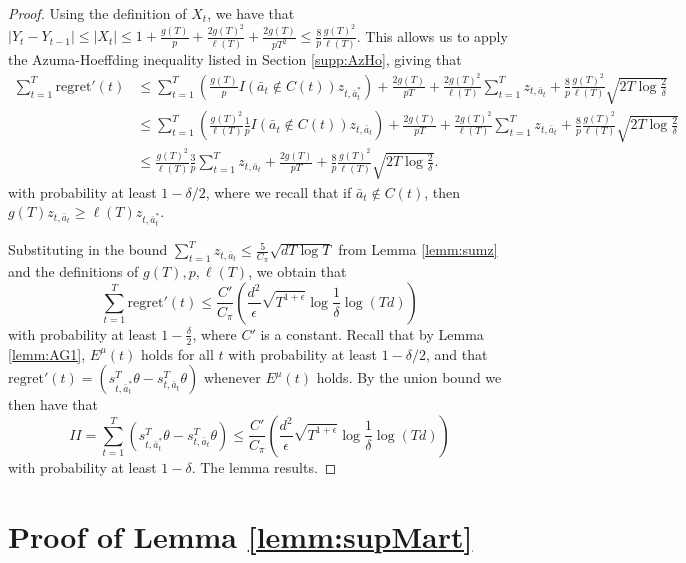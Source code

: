 \documentclass{article}
\begin{document}
\begin{appendices}
\begin{proof}
Using the definition of $X_t$, we have that $|Y_t - Y_{t-1}| \leq |X_t| \leq 1 + \frac{g(T)}{p} + \frac{2g(T)^2}{\ell(T)} + \frac{2 g(T)}{p T^2} \leq \frac{8}{p} \frac{g(T)^2}{\ell(T)}$. This allows us to apply the Azuma-Hoeffding inequality listed in Section \ref{supp:AzHo}, giving that
\begin{align*}
\sum_{t=1}^T \mathrm{regret}'(t) &\leq \sum_{t=1}^T \left(\frac{g(T)}{p} I(\bar{a}_t \notin C(t)) z_{t,\bar{a}^*_t}\right) + \frac{2 g(T)}{pT} + \frac{2 g(T)^2}{\ell(T)} \sum_{t=1}^T z_{t,\bar{a}_t} + \frac{8}{p}\frac{g(T)^2}{\ell(T)}\sqrt{2T \log \frac{2}{\delta}}\\
&\leq \sum_{t=1}^T \left(\frac{g(T)^2}{\ell(T)} \frac{1}{p} I(\bar{a}_t \notin C(t)) z_{t,\bar{a}_t}\right) + \frac{2 g(T)}{pT} + \frac{2 g(T)^2}{\ell(T)} \sum_{t=1}^T z_{t,\bar{a}_t} + \frac{8}{p} \frac{g(T)^2}{\ell(T)}\sqrt{2T \log \frac{2}{\delta}}\\
&\leq \frac{g(T)^2}{\ell(T)} \frac{3}{p} \sum_{t=1}^T z_{t,\bar{a}_t} + \frac{2 g(T)}{pT} + \frac{8}{p} \frac{g(T)^2}{\ell(T)} \sqrt{2T\log \frac{2}{\delta}}.
\end{align*}
with probability at least $1 - \delta/2$, where we recall that if $\bar{a}_t \notin C(t)$, then $g(T) z_{t,\bar{a}_t} \geq \ell(T) z_{t,\bar{a}^*_t}$. 

Substituting in the bound $\sum_{t=1}^T z_{t,\bar{a}_t} \leq \frac{5}{C_\pi} \sqrt{dT \log T}$ from Lemma \ref{lemm:sumz} and the definitions of $g(T), p, \ell(T)$, we obtain that 
\[
\sum_{t=1}^T \mathrm{regret}'(t) \leq \frac{C'}{C_\pi} \left(\frac{d^2}{\epsilon} \sqrt{T^{1+\epsilon}} \log \frac{1}{\delta} \log (Td)\right)
\]
with probability at least $1-\frac{\delta}{2}$, where $C'$ is a constant. Recall that by Lemma \ref{lemm:AG1}, $E^\mu(t)$ holds for all $t$ with probability at least $1- \delta/2$, and that $\mathrm{regret}'(t) = (s_{t,\bar{a}^*_t}^T \theta - s_{t,\bar{a}_t}^T \theta)$ whenever $E^\mu(t)$ holds. By the union bound we then have that
\[
II = \sum_{t=1}^T (s_{t,\bar{a}^*_t}^T \theta - s_{t,\bar{a}_t}^T \theta) \leq \frac{C'}{C_\pi} \left(\frac{d^2}{\epsilon} \sqrt{T^{1+\epsilon}} \log \frac{1}{\delta} \log (Td)\right)
\]
with probability at least $1-\delta$. The lemma results.

\end{proof}




\section{Proof of Lemma \ref{lemm:supMart}}
\label{supp:lemmsupMart}



\end{appendices}
\end{document}
